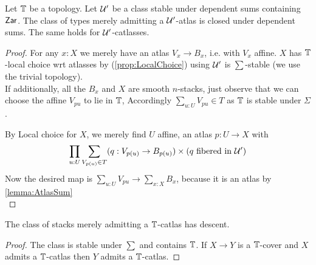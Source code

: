 \begin{theorem}{\label{thm:atlasStableSum}}
	Let $\mathbb{T}$ be a topology.
	Let $\mathcal{U}'$ be a class stable under dependent sums containing $\mathsf{Zar}$.
	The class of types merely admitting a $\mathcal{U}'$-atlas is closed under dependent sums. The same holds for $\mathcal{U}'$-catlasses.
\end{theorem}
\begin{proof}
	For any $x : X$ we merely have an atlas $V_x \to B_x$, i.e. with $V_x$ affine. %
	$X$ has $\mathbb{T}$-local choice wrt atlasses by (\ref{prop:LocalChoice}) using $\mathcal{U}'$ is $\sum$-stable (we use the trivial topology).\\
	If additionally, all the $B_x$ and $X$ are smooth $n$-stacks, just observe that we can choose the affine $V_{p u}$ to lie in $\mathbb{T}$, Accordingly $\sum_{u : U} V_{p u} \in T$ as $\mathbb{T}$ is stable under $\Sigma$.

	By Local choice for $X$, we merely find $U$ affine, an atlas $p : U \to X$ %
	with
	\[
	\prod_{u : U} \sum_{V_{p(u)} \in T} (q : V_{p(u)} \to B_{p(u)}) \times (q \ \text{fibered in } \mathcal{U}'  )
	\]
	Now the desired map is $\sum_{u : U} V_{p u} \to \sum_{x : X} B_x$, because it is  an atlas %
	by \ref{lemma:AtlasSum} \\
\end{proof}
%
\begin{corollary}{\label{cor:DescentCatlas}}
	The class of stacks merely admitting a $\mathbb{T}$-catlas has descent.
\end{corollary}
\begin{proof}
	The class is stable under $\sum$ and contains $\mathbb{T}$.
	If $X \to Y$ is a $\mathbb{T}$-cover and $X$ admits a $\mathbb{T}$-catlas then $Y$ admits a $\mathbb{T}$-catlas. %
\end{proof}